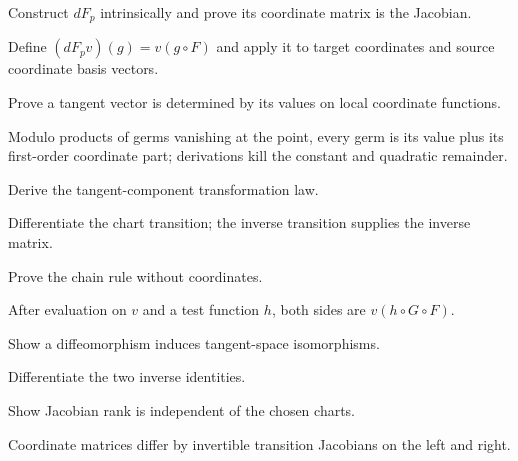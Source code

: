\begin{problem}\label{prob:vii04-03}
Construct \(dF_p\) intrinsically and prove its coordinate matrix is the Jacobian.
\end{problem}
\begin{solution}
Define \((dF_pv)(g)=v(g\circ F)\) and apply it to target coordinates and source coordinate basis vectors.
\end{solution}

\begin{problem}\label{prob:vii04-04}
Prove a tangent vector is determined by its values on local coordinate functions.
\end{problem}
\begin{solution}
Modulo products of germs vanishing at the point, every germ is its value plus its first-order coordinate part; derivations kill the constant and quadratic remainder.
\end{solution}

\begin{problem}\label{prob:vii04-05}
Derive the tangent-component transformation law.
\end{problem}
\begin{solution}
Differentiate the chart transition; the inverse transition supplies the inverse matrix.
\end{solution}

\begin{problem}\label{prob:vii04-06}
Prove the chain rule without coordinates.
\end{problem}
\begin{solution}
After evaluation on \(v\) and a test function \(h\), both sides are \(v(h\circ G\circ F)\).
\end{solution}

\begin{problem}\label{prob:vii04-07}
Show a diffeomorphism induces tangent-space isomorphisms.
\end{problem}
\begin{solution}
Differentiate the two inverse identities.
\end{solution}

\begin{problem}\label{prob:vii04-08}
Show Jacobian rank is independent of the chosen charts.
\end{problem}
\begin{solution}
Coordinate matrices differ by invertible transition Jacobians on the left and right.
\end{solution}

